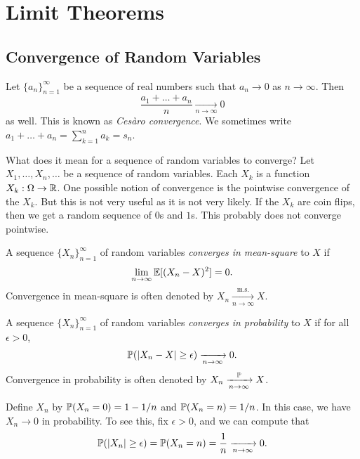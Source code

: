\chapter{Limit Theorems}

\section{Convergence of Random Variables}

\begin{example}
  Let $\{a_n\}_{n = 1}^\infty$ be a sequence of
  real numbers such that $a_n \to 0$ as $n \to \infty$.
  Then
  \[
    \frac{a_1 + \dots + a_n}{n} \xrightarrow[n \to \infty]{} 0
  \]
  as well. This is known as \emph{Ces\`aro convergence}.
  We sometimes write $a_1 + \dots + a_n = \sum_{k = 1}^n a_k = s_n$.
\end{example}

\begin{remark}
  What does it mean for a sequence of
  random variables to converge? Let $X_1, \dots, X_n, \dots$
  be a sequence of random variables. Each
  $X_k$ is a function $X_k : \Omega \to \mathbb{R}$.
  One possible notion of convergence is
  the pointwise convergence of the $X_k$. But this is
  not very useful as it is not very
  likely. If the $X_k$ are
  coin flips, then we get a random
  sequence of $0$s and $1$s. This probably does
  not converge pointwise.
\end{remark}

\begin{definition}
  A sequence $\{X_n\}_{n = 1}^\infty$ of random
  variables \emph{converges in mean-square}
  to $X$ if
  \[
    \lim_{n \to \infty} \mathbb{E}[(X_n - X)^2] = 0.
  \]
  Convergence in mean-square is often denoted
  by $X_n \xrightarrow[n \to \infty]{\mathrm{m.s.}} X$.
\end{definition}

\begin{definition}
  A sequence $\{X_n\}_{n = 1}^\infty$ of random
  variables \emph{converges in probability} to
  $X$ if for all $\epsilon > 0$,
  \[
    \mathbb{P}(|X_n - X| \ge \epsilon) \xrightarrow[n \to \infty]{} 0.
  \]
  Convergence in probability is often denoted
  by $X_n \xrightarrow[n \to \infty]{\mathbb{P}} X$.
\end{definition}

\begin{example}
  Define $X_n$ by
  $\mathbb{P}(X_n = 0) = 1 - 1 / n$ and
  $\mathbb{P}(X_n = n) = 1 / n$.
  In this case, we have $X_n \to 0$ in probability.
  To see this, fix $\epsilon > 0$, and we can compute
  that
  \[
    \mathbb{P}(|X_n| \ge \epsilon)
    = \mathbb{P}(X_n = n) = \frac{1}{n} \xrightarrow[n \to \infty]{} 0.
  \]
\end{example}

